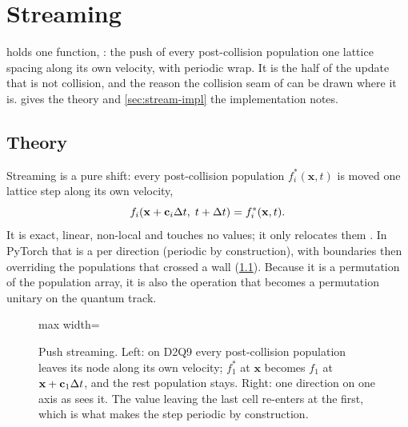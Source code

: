 
\chapter{Streaming}

\label{Chapter5}

 holds one function, : the push of every
post-collision population one lattice spacing along its own velocity, with periodic wrap.
It is the half of the update that is not collision, and the reason the collision seam of
 can be drawn where it is.  gives the theory and
\cref{sec:stream-impl} the implementation notes.


\section{Theory}\label{sec:stream-theory}

Streaming is a pure shift: every post-collision population $f_i^{*}(\mathbf{x}, t)$ is moved
one lattice step along its own velocity,
\begin{equation}
f_i(\mathbf{x} + \mathbf{c}_i\Delta t,\; t + \Delta t) = f_i^{*}(\mathbf{x}, t).
\label{eq:stream}
\end{equation}
It is exact, linear, non-local and touches no values; it only relocates them
\parencite{Kruger2017}. In PyTorch that is a  per direction (periodic by
construction), with boundaries then overriding the populations that crossed a wall
(\cref{fig:push}). Because it is a permutation of the population array, it is also the
operation that becomes a permutation unitary on the quantum track.

\begin{figure}[h]
\centering
\begin{adjustbox}{max width=\linewidth}\end{adjustbox}
\caption{Push streaming. Left: on D2Q9 every post-collision population leaves its node along
its own velocity; $f_1^{*}$ at $\mathbf{x}$ becomes $f_1$ at $\mathbf{x} + \mathbf{c}_1\Delta t$,
and the rest population stays. Right: one direction on one axis as  sees
it. The value leaving the last cell re-enters at the first, which is what makes the step
periodic by construction.}
\label{fig:push}
\end{figure}

